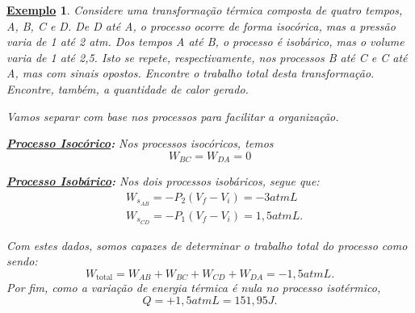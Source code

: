 \documentclass{article}
\newtheorem{example}{\underline{Exemplo}}
\begin{document}
\begin{example}
  Considere uma transformação térmica composta de quatro tempos, A, B, C e D. De D até A, o processo ocorre
  de forma isocórica, mas a pressão varia de 1 até 2 atm. Dos tempos A até B, o processo é isobárico, mas o volume varia
  de 1 até 2,5. Isto se repete, respectivamente, nos processos B até C e C até A, mas com sinais opostos. Encontre o trabalho total 
  desta transformação. Encontre, também, a quantidade de calor gerado.

  Vamos separar com base nos processos para facilitar a organização.

  \textbf{\underline{Processo Isocórico}:}
  Nos processos isocóricos, temos 
  \[
    W_{BC} = W_{DA} = 0
  \]

  \textbf{\underline{Processo Isobárico}:}
  Nos dois processos isobáricos, segue que:
  \begin{align*}
  &W_{s_{AB}} = -P_{2}(V_{f}-V_{i}) = -3atmL\\
  &W_{s_{CD}} = -P_{1}(V_{f}-V_{i}) = 1,5atmL.
  \end{align*}

  Com estes dados, somos capazes de determinar o trabalho total do processo como sendo:
  \[
    W_{\text{total}} = W_{AB} + W_{BC} + W_{CD} + W_{DA} = -1,5atmL.
  \]
  Por fim, como a variação de energia térmica é nula no processo isotérmico,
  \[
    Q = +1,5atmL = 151,95J.
  \]
\end{example}
\end{document}

